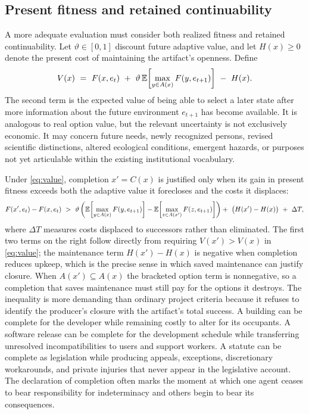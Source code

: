 \subsection{Present fitness and retained continuability}

A more adequate evaluation must consider both realized fitness and retained continuability. Let $\vartheta\in[0,1]$ discount future adaptive value, and let $H(x)\geq 0$ denote the present cost of maintaining the artifact's openness. Define
\begin{equation}\label{eq:value}
V(x)\ =\ F(x,e_t)\ +\ \vartheta\,\mathbb{E}\!\left[\max_{y\in A(x)}F(y,e_{t+1})\right]\ -\ H(x).
\end{equation}
The second term is the expected value of being able to select a later state after more information about the future environment $e_{t+1}$ has become available. It is analogous to real option value, but the relevant uncertainty is not exclusively economic. It may concern future needs, newly recognized persons, revised scientific distinctions, altered ecological conditions, emergent hazards, or purposes not yet articulable within the existing institutional vocabulary.

Under \eqref{eq:value}, completion $x'=C(x)$ is justified only when its gain in present fitness exceeds both the adaptive value it forecloses and the costs it displaces:
\begin{equation}\label{eq:completion-justified}
F(x',e_t)-F(x,e_t)\ >\
\vartheta\left(\mathbb{E}\!\left[\max_{y\in A(x)}F(y,e_{t+1})\right]-\mathbb{E}\!\left[\max_{z\in A(x')}F(z,e_{t+1})\right]\right)
+\ \big(H(x')-H(x)\big)\ +\ \Delta T,
\end{equation}
where $\Delta T$ measures costs displaced to successors rather than eliminated. The first two terms on the right follow directly from requiring $V(x')>V(x)$ in \eqref{eq:value}; the maintenance term $H(x')-H(x)$ is negative when completion reduces upkeep, which is the precise sense in which saved maintenance can justify closure. When $A(x')\subseteq A(x)$ the bracketed option term is nonnegative, so a completion that saves maintenance must still pay for the options it destroys. The inequality is more demanding than ordinary project criteria because it refuses to identify the producer's closure with the artifact's total success. A building can be complete for the developer while remaining costly to alter for its occupants. A software release can be complete for the development schedule while transferring unresolved incompatibilities to users and support workers. A statute can be complete as legislation while producing appeals, exceptions, discretionary workarounds, and private injuries that never appear in the legislative account. The declaration of completion often marks the moment at which one agent ceases to bear responsibility for indeterminacy and others begin to bear its consequences.

